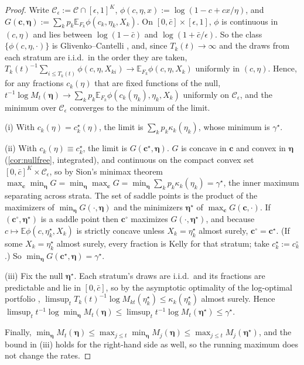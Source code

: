 \documentclass[11pt]{article}
\newcommand{\bs}{\boldsymbol}
\newcommand{\E}{\mathbb{E}}
\newcommand{\calC}{\mathcal{C}}
\newcommand{\cbar}{\bar c}
\theoremstyle{plain}
\theoremstyle{definition}
\theoremstyle{remark}
\begin{document}
\begin{proof}
Write $\calC_\epsilon:=\calC\cap[\epsilon,1]^K$, $\phi(c,\eta,x):=\log(1-c+cx/\eta)$, and
$G(\bs c,\bs\eta):=\sum_kp_k\E_{F_k}\phi(c_k,\eta_k,X_k)$.  On $[0,\cbar]\times[\epsilon,1]$, $\phi$ is continuous in
$(c,\eta)$ and lies between $\log(1-\cbar)$ and $\log(1+\cbar/\epsilon)$.  So the class $\{\phi(c,\eta,\cdot)\}$ is
Glivenko--Cantelli \citep[Example 19.8]{vandervaart1998asymptotic}, and, since $T_k(t)\to\infty$ and the draws from each
stratum are i.i.d.\ in the order they are taken, $T_k(t)^{-1}\sum_{i\le T_k(t)}\phi(c,\eta,X_{ki})\to\E_{F_k}\phi(c,\eta,X_k)$
uniformly in $(c,\eta)$.  Hence, for any fractions $c_k(\eta)$ that are fixed functions of the null,
$t^{-1}\log M_t(\bs\eta)\to\sum_kp_k\E_{F_k}\phi(c_k(\eta_k),\eta_k,X_k)$ uniformly on $\calC_\epsilon$, and the minimum
over $\calC_\epsilon$ converges to the minimum of the limit.

(i) With $c_k(\eta)=c^\star_k(\eta)$, the limit is $\sum_kp_k\kappa_k(\eta_k)$, whose minimum is $\gamma^\star$.

(ii) With $c_k(\eta)\equiv c^\star_k$, the limit is $G(\bs c^\star,\bs\eta)$.  $G$ is concave in $\bs c$ and convex in
$\bs\eta$ (\cref{cor:nullfree}, integrated), and continuous on the compact convex set $[0,\cbar]^K\times\calC_\epsilon$,
so by Sion's minimax theorem \citep{sion1958general}
$\max_{\bs c}\min_{\bs\eta}G=\min_{\bs\eta}\max_{\bs c}G=\min_{\bs\eta}\sum_kp_k\kappa_k(\eta_k)=\gamma^\star$, the inner
maximum separating across strata.  The set of saddle points is the product of the maximizers of
$\min_{\bs\eta}G(\cdot,\bs\eta)$ and the minimizers $\bs\eta^\star$ of $\max_{\bs c}G(\bs c,\cdot)$.  If
$(\bs c^\circ,\bs\eta^\star)$ is a saddle point then $\bs c^\circ$ maximizes $G(\cdot,\bs\eta^\star)$, and because
$c\mapsto\E\phi(c,\eta^\star_k,X_k)$ is strictly concave unless $X_k=\eta^\star_k$ almost surely, $\bs c^\circ=\bs c^\star$.
(If some $X_k=\eta^\star_k$ almost surely, every fraction is Kelly for that stratum; take $c^\star_k:=c^\circ_k$.)
So $\min_{\bs\eta}G(\bs c^\star,\bs\eta)=\gamma^\star$.

(iii) Fix the null $\bs\eta^\star$.  Each stratum's draws are i.i.d.\ and its fractions are predictable and lie in
$[0,\cbar]$, so by the asymptotic optimality of the log-optimal portfolio \citep{breiman1961optimal, algoet1988asymptotic},
$\limsup_t T_k(t)^{-1}\log M_{kt}(\eta^\star_k)\le\kappa_k(\eta^\star_k)$ almost surely.  Hence
$\limsup_t t^{-1}\log\min_{\bs\eta}M_t(\bs\eta)\le\limsup_t t^{-1}\log M_t(\bs\eta^\star)\le\gamma^\star$.

Finally, $\min_{\bs\eta}M_t(\bs\eta)\le\max_{j\le t}\min_{\bs\eta}M_j(\bs\eta)\le\max_{j\le t}M_j(\bs\eta^\star)$, and the
bound in (iii) holds for the right-hand side as well, so the running maximum does not change the rates.
\end{proof}
\end{document}
